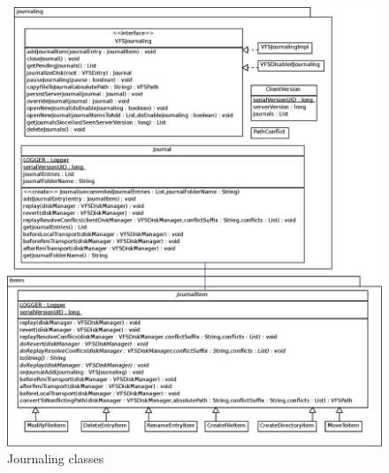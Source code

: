\begin{figure}[h!]
\centering
\includegraphics[width=1\textwidth]{figures/22Journaling.eps}
\caption{Journaling classes}
\label{fig:journaling_classes}
\end{figure}

